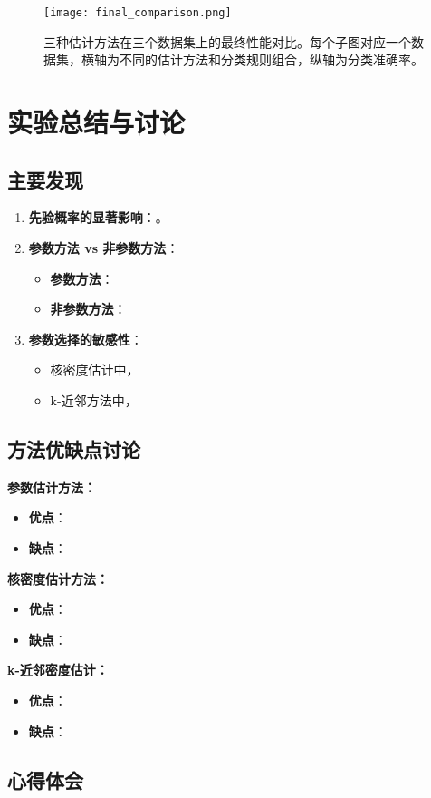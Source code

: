 \documentclass[12pt]{article}
\begin{document}
\begin{figure}[htbp]
\centering
\texttt{[image: final\_comparison.png]}
\caption{三种估计方法在三个数据集上的最终性能对比。每个子图对应一个数据集，横轴为不同的估计方法和分类规则组合，纵轴为分类准确率。}
\label{fig:final_comparison}
\end{figure}

\section{实验总结与讨论}

\subsection{主要发现}
\begin{enumerate}
    \item \textbf{先验概率的显著影响}：。
    
    \item \textbf{参数方法 vs 非参数方法}：
    \begin{itemize}
        \item \textbf{参数方法}：
        \item \textbf{非参数方法}：
    \end{itemize}
    
    
    \item \textbf{参数选择的敏感性}：
    \begin{itemize}
        \item 核密度估计中，
        \item k-近邻方法中，
    \end{itemize}
\end{enumerate}

\subsection{方法优缺点讨论}

\textbf{参数估计方法：}
\begin{itemize}
    \item \textbf{优点}：
    \item \textbf{缺点}：
\end{itemize}

\textbf{核密度估计方法：}
\begin{itemize}
    \item \textbf{优点}：
    \item \textbf{缺点}：
\end{itemize}

\textbf{k-近邻密度估计：}
\begin{itemize}
    \item \textbf{优点}：
    \item \textbf{缺点}：
\end{itemize}

\subsection{心得体会}
\end{document}
